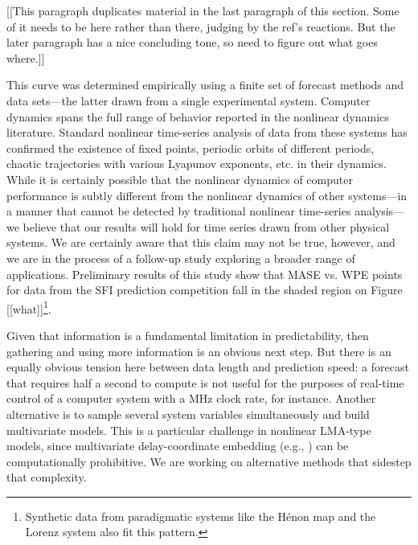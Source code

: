 [[This paragraph duplicates material in the last paragraph of this
    section.  Some of it needs to be here rather than there, judging
    by the ref's reactions.  But the later paragraph has a nice
    concluding tone, so need to figure out what goes where.]]

This curve was determined empirically using a finite set of forecast
methods and data sets---the latter drawn from a single experimental
system.  Computer dynamics spans the full range of behavior reported
in the nonlinear dynamics literature.  Standard nonlinear time-series
analysis of data from these systems has confirmed the existence of
fixed points, periodic orbits of different periods, chaotic
trajectories with various Lyapunov exponents, etc. in their dynamics.
While it is certainly possible that the nonlinear dynamics of computer
performance is subtly different from the nonlinear dynamics of other
systems---in a manner that cannot be detected by traditional nonlinear
time-series analysis---we believe that our results will hold for time
series drawn from other physical systems.  We are certainly aware that
this claim may not be true, however, and we are in the process of a
follow-up study exploring a broader range of applications.
Preliminary results of this study show that MASE vs. WPE points for
data from the SFI prediction competition \cite{weigend-book} fall in
the shaded region on Figure [[what]]\footnote{Synthetic data from
  paradigmatic systems like the H\'{e}non map \cite{henon} and the
  Lorenz system \cite{lorenz} also fit this pattern.}.

Given that information is a fundamental limitation in predictability,
then gathering and using more information is an obvious next step.
But there is an equally obvious tension here between data length and
prediction speed: a forecast that requires half a second to compute is
not useful for the purposes of real-time control of a computer system
with a MHz clock rate, for instance.  Another alternative is to sample
several system variables simultaneously and build multivariate models.
This is a particular challenge in nonlinear LMA-type models, since
multivariate delay-coordinate embedding (e.g.,
\cite{cao-multivariate-embedding,deyle-sugihara2011}) can be
computationally prohibitive.  We are working on alternative methods
that sidestep that complexity.


